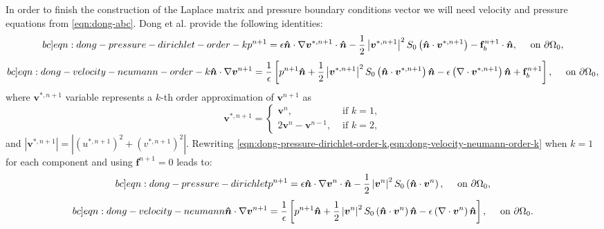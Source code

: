 \documentclass{article}
\numberwithin{equation}{section}
\begin{document}
In order to finish the construction of the Laplace matrix and pressure boundary conditions vector we will need velocity and pressure equations from \cref{eqn:dong-abc}. Dong et al. provide the following identities:
\begin{equation}\label[bc]{eqn:dong-pressure-dirichlet-order-k}
p^{n+1}=\epsilon \boldsymbol{\hat{n}} \cdot \nabla \boldsymbol{v}^{*, n+1} \cdot \boldsymbol{\hat{n}}-\frac{1}{2}\left|\boldsymbol{v}^{*, n+1}\right|^2 S_0\left(\boldsymbol{\hat{n}} \cdot \boldsymbol{v}^{*, n+1}\right)-\mathbf{f}_b^{n+1} \cdot \boldsymbol{\hat{n}}, \quad \text { on } \partial \Omega_0,
\end{equation}
\begin{equation}\label[bc]{eqn:dong-velocity-neumann-order-k}
\boldsymbol{\hat{n}} \cdot \nabla \boldsymbol{v}^{n+1}=\frac{1}{\epsilon}\left[p^{n+1} \boldsymbol{\hat{n}}+\frac{1}{2}\left|\boldsymbol{v}^{*, n+1}\right|^2 S_0\left(\boldsymbol{\hat{n}} \cdot \boldsymbol{v}^{*, n+1}\right) \boldsymbol{\hat{n}}-\epsilon\left(\nabla \cdot \boldsymbol{v}^{*, n+1}\right) \boldsymbol{\hat{n}}+\mathbf{f}_b^{n+1}\right], \quad \text { on } \partial \Omega_0,
\end{equation}
where $\boldsymbol{v}^{*, n+1}$ variable represents a $k$-th order approximation of $\boldsymbol{v}^{n+1}$ as
\begin{equation}
\boldsymbol{v}^{*, n+1}= \begin{cases}\boldsymbol{v}^n, & \text { if } k=1, \\ 2 \boldsymbol{v}^n-\boldsymbol{v}^{n-1}, & \text { if } k=2 ,\end{cases}
\end{equation}
and $\left|\boldsymbol{v}^{*, n+1}\right|=\left| \left({u}^{*, n+1}\right)^2 + \left({v}^{*, n+1}\right)^2\right|$.
Rewriting \cref{eqn:dong-pressure-dirichlet-order-k,eqn:dong-velocity-neumann-order-k} when $k=1$ for each component and using $\mathbf{f}^{n+1}=0$ leads to:
\begin{equation}\label[bc]{eqn:dong-pressure-dirichlet}
	p^{n+1}=\epsilon \boldsymbol{\hat{n}} \cdot \nabla \boldsymbol{v}^n \cdot \boldsymbol{\hat{n}}-\frac{1}{2}\left|\boldsymbol{v}^n\right|^2 S_0\left(\boldsymbol{\hat{n}} \cdot \boldsymbol{v}^n\right), \quad \text { on } \partial \Omega_0,
\end{equation}
\begin{equation}\label[bc]{eqn:dong-velocity-neumann}
\boldsymbol{\hat{n}}\cdot \nabla \boldsymbol{v}^{n+1}=\frac{1}{\epsilon}\left[p^{n+1} 
	\boldsymbol{\hat{n}}+\frac{1}{2}\left|\boldsymbol{v}^n\right|^2 S_0\left(\boldsymbol{\hat{n}} \cdot \boldsymbol{v}^n\right) \boldsymbol{\hat{n}}-\epsilon\left(\nabla \cdot \boldsymbol{v}^n\right) \boldsymbol{\hat{n}}\right], \quad \text { on } \partial \Omega_0.
\end{equation}
\end{document}
